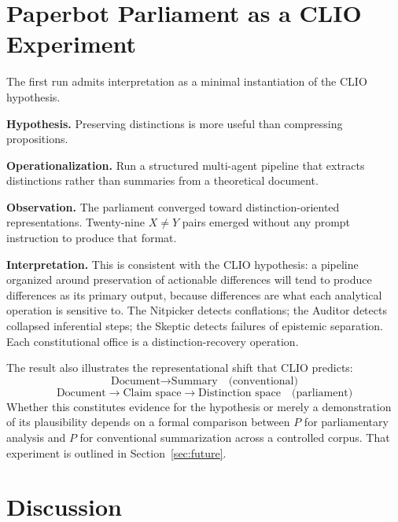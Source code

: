 \documentclass[12pt, a4paper]{article}
\theoremstyle{principle}
\theoremstyle{definition}
\begin{document}
\section{Paperbot Parliament as a CLIO Experiment}
\label{sec:clio}

The first run admits interpretation as a minimal instantiation of the CLIO
hypothesis.

\medskip
\noindent\textbf{Hypothesis.}
Preserving distinctions is more useful than compressing propositions.

\medskip
\noindent\textbf{Operationalization.}
Run a structured multi-agent pipeline that extracts distinctions rather than
summaries from a theoretical document.

\medskip
\noindent\textbf{Observation.}
The parliament converged toward distinction-oriented representations. Twenty-nine
$X \neq Y$ pairs emerged without any prompt instruction to produce that format.

\medskip
\noindent\textbf{Interpretation.}
This is consistent with the CLIO hypothesis: a pipeline organized around
preservation of actionable differences will tend to produce differences as its
primary output, because differences are what each analytical operation is
sensitive to. The Nitpicker detects conflations; the Auditor detects collapsed
inferential steps; the Skeptic detects failures of epistemic separation.
Each constitutional office is a distinction-recovery operation.

\medskip
The result also illustrates the representational shift that CLIO predicts:
\[
\text{Document} \longrightarrow \text{Summary}
\quad\text{(conventional)}
\]
\[
\text{Document} \longrightarrow \text{Claim space}
              \longrightarrow \text{Distinction space}
\quad\text{(parliament)}
\]
Whether this constitutes evidence for the hypothesis or merely a demonstration of
its plausibility depends on a formal comparison between $P$ for parliamentary
analysis and $P$ for conventional summarization across a controlled corpus.
That experiment is outlined in Section~\ref{sec:future}.

\section{Discussion}
\end{document}
